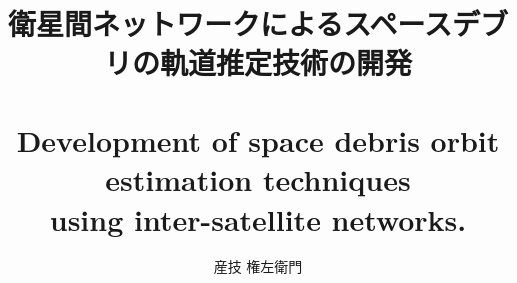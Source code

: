 \documentclass[10.5pt,a4j,dvipdfmx,openany]{jsbook}


\title{\LARGE{}\\\mbox{}\\
  衛星間ネットワークによるスペースデブリの軌道推定技術の開発\\ \mbox{}\\
Development of space debris orbit estimation techniques\\using inter-satellite networks.}
\author{産技 権左衛門}


\maketitle
\tableofcontents
\listoftables
\listoffigures
\clearpage
\chapter{序論}
\section{社会的背景}
\label{背景}
\subsection*{第五期科学技術基本計画実現に向けて}
内閣府が提出した第五期科学技術基本計画\cite{第五期科学技術基本計画}において, 
仮想空間と現実空間が高度に融合したデータ駆動社会, 所謂Society5.0が提唱された.
Society5.0では, 
これまで個別に機能していた生産, 流通, 教育, 医療, 金融等, 
異分野のあらゆるシステムが仮想空間を通じて協調・統合することで, 
多様な知識・技術の融合が行われる. 
またこれにより, 産業構造の変革や技術革新を促し, 
社会の至るところで新たな価値が創出することが期待される.
このような持続的イノベーション創出基盤を確立することは, 
今後の我が国の国際競争における優位性を確保し, ひいては経済成長の強力な足場となり得る.

翻って, ........
\subsection*{スペースデブリと宇宙開発}
現在, スペースデブリの推定個数は.....
\section{本研究の目的}
本研究では〜

